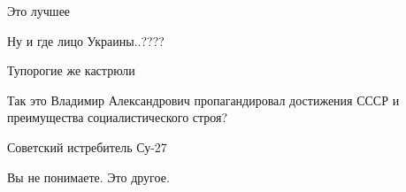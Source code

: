 \begin{itemize}
\begin{itemize}
\end{itemize}

 
Это лучшее

 
Ну и где лицо Украины..????

 
Тупорогие же кастрюли

 
Так это Владимир Александрович пропагандировал достижения СССР и преимущества социалистического строя?

 
Советский истребитель Су-27

 
Вы не понимаете. Это другое.


\end{itemize}

